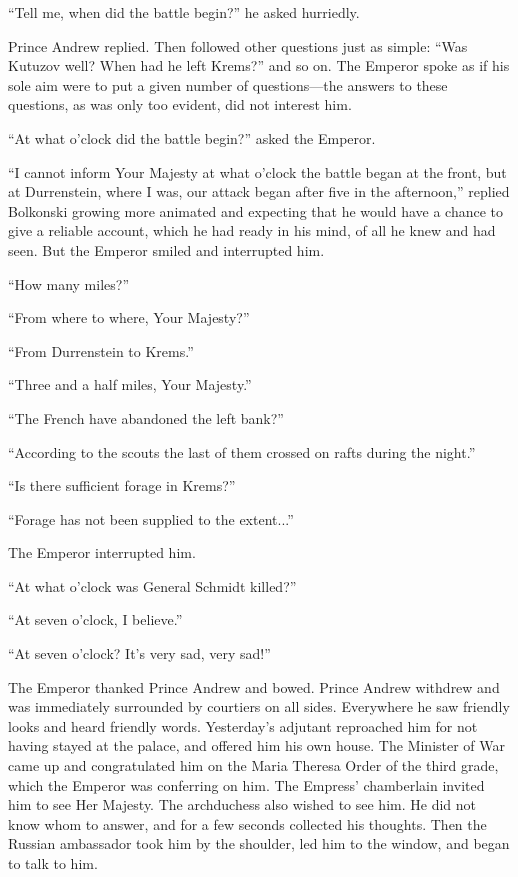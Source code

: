 ``Tell me, when did the battle begin?'' he asked hurriedly.

Prince Andrew replied. Then followed other questions just as
simple: ``Was Kutuzov well? When had he left Krems?'' and so
on. The Emperor spoke as if his sole aim were to put a given
number of questions---the answers to these questions, as was only
too evident, did not interest him.

``At what o'clock did the battle begin?'' asked the Emperor.

``I cannot inform Your Majesty at what o'clock the battle began
at the front, but at Durrenstein, where I was, our attack began
after five in the afternoon,'' replied Bolkonski growing more
animated and expecting that he would have a chance to give a
reliable account, which he had ready in his mind, of all he knew
and had seen. But the Emperor smiled and interrupted him.

``How many miles?''

``From where to where, Your Majesty?''

``From Durrenstein to Krems.''

``Three and a half miles, Your Majesty.''

``The French have abandoned the left bank?''

``According to the scouts the last of them crossed on rafts
during the night.''

``Is there sufficient forage in Krems?''

``Forage has not been supplied to the extent...''

The Emperor interrupted him.

``At what o'clock was General Schmidt killed?''

``At seven o'clock, I believe.''

``At seven o'clock? It's very sad, very sad!''

The Emperor thanked Prince Andrew and bowed. Prince Andrew
withdrew and was immediately surrounded by courtiers on all
sides. Everywhere he saw friendly looks and heard friendly
words. Yesterday's adjutant reproached him for not having stayed
at the palace, and offered him his own house.  The Minister of
War came up and congratulated him on the Maria Theresa Order of
the third grade, which the Emperor was conferring on him. The
Empress' chamberlain invited him to see Her Majesty. The
archduchess also wished to see him. He did not know whom to
answer, and for a few seconds collected his thoughts. Then the
Russian ambassador took him by the shoulder, led him to the
window, and began to talk to him.


